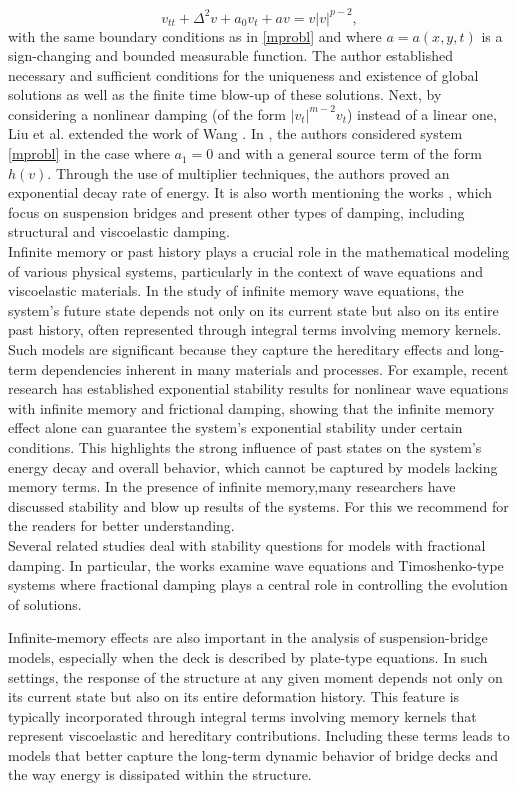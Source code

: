 \documentclass[12pt]{article}
\numberwithin{equation}{section}
\begin{document}
$$v_{tt}+\Delta^2 v +a_0 v_t+a v=v\vert v\vert^{p-2},$$
with the same boundary conditions as in \eqref{mprobl} and where $a=a(x,y,t)$ is a sign-changing and bounded measurable function. The author established necessary and sufficient conditions for the uniqueness and existence of global solutions as well as the finite time blow-up of these solutions. Next, by considering a nonlinear damping (of the form $\vert v_t\vert^{m-2}v_t$) instead of a linear one,  Liu et al. \cite{Liu}  extended the work of Wang \cite{Wang}. In \cite{Mess1}, the authors considered system \eqref{mprobl} in the case where $a_1=0$ and with a general source term of the form $h(v)$. Through the use of multiplier techniques, the authors proved an exponential decay rate of energy. It is also worth mentioning the works \cite{Haj1, Haj2, Haj3, Mess2}, which focus on suspension bridges and present other types of damping, including structural and viscoelastic damping.\\
Infinite memory or past history plays a crucial role in the mathematical modeling of various physical systems, particularly in the context of wave equations and viscoelastic materials. In the study of infinite memory wave equations, the system's future state depends not only on its current state but also on its entire past history, often represented through integral terms involving memory kernels. Such models are significant because they capture the hereditary effects and long-term dependencies inherent in many materials and processes. For example, recent research has established exponential stability results for nonlinear wave equations with infinite memory and frictional damping, showing that the infinite memory effect alone can guarantee the system's exponential stability under certain conditions. This highlights the strong influence of past states on the system's energy decay and overall behavior, which cannot be captured by models lacking memory terms. In the presence of infinite memory,many researchers have discussed stability and blow up results of the systems. For this we recommend \cite{FA1,DA,KR,FA2} for the readers for better understanding.\\
Several related studies deal with stability questions for models with fractional
damping. In particular, the works \cite{Akil1, Akil2, Benaissa2, Benaissa1, ZH, FA3}
examine wave equations and Timoshenko-type systems where fractional damping plays a
central role in controlling the evolution of solutions.

Infinite-memory effects are also important in the analysis of suspension-bridge
models, especially when the deck is described by plate-type equations. In such
settings, the response of the structure at any given moment depends not only on its
current state but also on its entire deformation history. This feature is typically
incorporated through integral terms involving memory kernels that represent
viscoelastic and hereditary contributions. Including these terms leads to models that
better capture the long-term dynamic behavior of bridge decks and the way energy is
dissipated within the structure.
\end{document}
